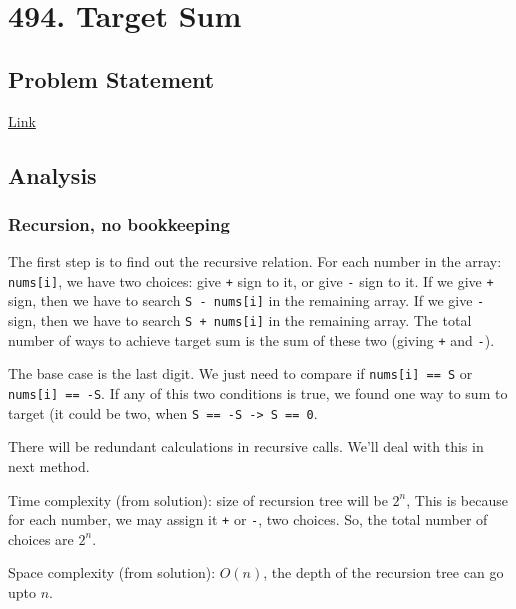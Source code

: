 \documentclass[11pt]{article}
\begin{document}
\section{494. Target Sum}
\label{sec:org83edfd1}
\subsection{Problem Statement}
\label{sec:org7dc3417}
\href{https://leetcode.com/problems/target-sum/}{Link}
\subsection{Analysis}
\label{sec:org5172fbc}
\subsubsection{Recursion, no bookkeeping}
\label{sec:org3f66c01}
The first step is to find out the recursive relation. For each number in the array: \texttt{nums[i]}, we have two choices: give \texttt{+} sign to it, or give \texttt{-} sign to it. If we give \texttt{+} sign, then we have to search \texttt{S - nums[i]} in the remaining array. If we give \texttt{-} sign, then we have to search \texttt{S + nums[i]} in the remaining array. The total number of ways to achieve target sum is the sum of these two (giving \texttt{+} and \texttt{-}).

The base case is the last digit. We just need to compare if \texttt{nums[i] == S} or \texttt{nums[i] == -S}. If any of this two conditions is true, we found one way to sum to target (it could be two, when \texttt{S == -S -> S == 0}.

There will be redundant calculations in recursive calls. We'll deal with this in next method.

Time complexity (from solution): size of recursion tree will be \(2^n\), This is because for each number, we may assign it \texttt{+} or \texttt{-}, two choices. So, the total number of choices are \(2^n\).

Space complexity (from solution): \(O(n)\), the depth of the recursion tree can go upto \(n\).
\end{document}
